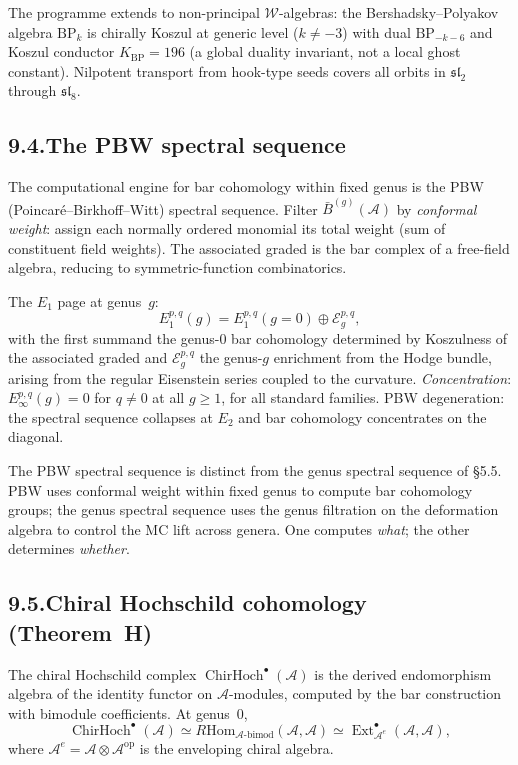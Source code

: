 \documentclass[11pt,reqno]{amsart}
\theoremstyle{definition}
\theoremstyle{remark}
\providecommand{\cA}{\mathcal{A}}
\providecommand{\cE}{\mathcal{E}}
\providecommand{\barB}{\bar{B}}
\providecommand{\Hom}{\mathrm{Hom}}
\numberwithin{equation}{section}
\begin{document}
The programme extends to non-principal $\mathcal W$-algebras: the
Bershadsky--Polyakov algebra $\mathrm{BP}_k$ is chirally Koszul at generic level ($k \neq -3$) with
dual $\mathrm{BP}_{-k-6}$ and Koszul conductor
$K_{\mathrm{BP}}=196$ (a global duality invariant, not
a local ghost constant). Nilpotent transport from hook-type seeds
covers all orbits in $\mathfrak{sl}_2$ through $\mathfrak{sl}_8$.

\subsection*{9.4.\enspace The PBW spectral sequence}

The computational engine for bar cohomology within fixed genus is the
PBW (Poincar\'e--Birkhoff--Witt) spectral sequence. Filter
$\barB^{(g)}(\cA)$ by \emph{conformal weight}: assign each normally
ordered monomial its total weight (sum of constituent field weights).
The associated graded is the bar complex of a free-field algebra,
reducing to symmetric-function combinatorics.

The $E_1$ page at genus~$g$:
\[
E_1^{p,q}(g)=E_1^{p,q}(g{=}0)\oplus\cE^{p,q}_g,
\]
with the first summand the genus-$0$ bar cohomology determined by
Koszulness of the associated graded and $\cE^{p,q}_g$ the genus-$g$
enrichment from the Hodge bundle, arising from the regular Eisenstein
series coupled to the curvature. \emph{Concentration}:
$E_\infty^{p,q}(g)=0$ for $q\neq 0$ at all $g\ge 1$, for all standard
families. PBW degeneration: the spectral sequence collapses at $E_2$
and bar cohomology concentrates on the diagonal.

The PBW spectral sequence is distinct from the genus spectral sequence
of \S5.5. PBW uses conformal weight within fixed genus to compute bar
cohomology groups; the genus spectral sequence uses the genus
filtration on the deformation algebra to control the MC lift across
genera. One computes \emph{what}; the other determines \emph{whether}.

\subsection*{9.5.\enspace Chiral Hochschild cohomology (Theorem~H)}

The chiral Hochschild complex $\operatorname{ChirHoch}^\bullet(\cA)$
is the derived endomorphism algebra of the identity functor on
$\cA$-modules, computed by the bar construction with bimodule
coefficients. At genus~$0$,
\[
\operatorname{ChirHoch}^\bullet(\cA)\simeq R\Hom_{\cA\text{-bimod}}(\cA,\cA)\simeq\operatorname{Ext}^\bullet_{\cA^e}(\cA,\cA),
\]
where $\cA^e=\cA\otimes\cA^{\mathrm{op}}$ is the enveloping chiral
algebra.
\end{document}
